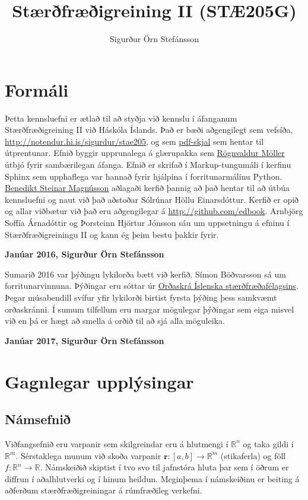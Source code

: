 \documentclass[a4paper,10pt,icelandic]{sphinxmanual}
\title{Stærðfræðigreining II (STÆ205G)}
\author{Sigurður Örn Stefánsson}
\begin{document}
\maketitle
\tableofcontents
{}\label{index::doc}



\chapter*{Formáli}
\label{formali::doc}\label{formali:staerfraeigreining-ii-stae205g-haskoli-islands-vor-2016}\label{formali:formali}
Þetta kennsluefni er ætlað til að styðja við kennslu í áfanganum
Stærðfræðigreining II við Háskóla Íslands. Það er bæði aðgengilegt sem
vefsíða, \href{http://notendur.hi.is/sigurdur/stae205}{http://notendur.hi.is/sigurdur/stae205}, og sem \href{https://notendur.hi.is/sigurdur/stae205/stae205.pdf}{pdf-skjal} sem hentar
til útprentunar. Efnið byggir upprunalega á glærupakka sem \href{http://starfsfolk.hi.is/simaskra/1198}{Rögnvaldur
Möller} útbjó fyrir sambærilegan áfanga. Efnið er skrifað í
Markup-tungumáli í kerfinu Sphinx sem upphaflega var hannað fyrir
hjálpina í forritunarmálinu Python. \href{http://notendur.hi.is/bsm}{Benedikt Steinar Magnússon} aðlagaði kerfið þannig að það hentar til
að útbúa kennsluefni og naut við það aðstoðar Sólrúnar Höllu
Einarsdóttur. Kerfið er opið og allar viðbætur við það eru
aðgengilegar á \href{http://github.com/edbook}{http://github.com/edbook}. Arnbjörg Soffía Árnadóttir og
Þorsteinn Hjörtur Jónsson sáu um uppsetningu á efninu í
Stærðfræðigreiningu II og kann ég þeim bestu þakkir fyrir.

\textbf{Janúar 2016, Sigurður Örn Stefánsson}

Sumarið 2016 var þýðingu lykilorða bætt við kerfið. Símon Böðvarsson sá um forritunarvinnuna. Þýðingar eru sóttar úr \href{http://stæ.is/os}{Orðaskrá Íslenska stærðfræðafélagsins}. Þegar músabendill svífur yfir lykilorði birtist fyrsta þýðing þess samkvæmt orðaskránni. Í sumum tilfellum eru margar mögulegar þýðingar sem eiga misvel við en þá er hægt að smella á orðið til að sjá alla möguleika.

\textbf{Janúar 2017, Sigurður Örn Stefánsson}


\chapter*{Gagnlegar upplýsingar}
\label{umnamskeidid::doc}\label{umnamskeidid:gagnlegar-upplysingar}

\section*{Námsefnið}
\label{umnamskeidid:namsefni}
Viðfangsefnið eru varpanir sem skilgreindar eru á
hlutmengi í \(\mathbb{R}^n\) og taka gildi í \(\mathbb{R}^m\).  Sérstaklega munum við skoða
varpanir \(\mathbf{r}:[a,b]\rightarrow \mathbb{R}^m\) (stikaferla) og föll \(f:\mathbb{R}^n\rightarrow
\mathbb{R}\).  Námskeiðið skiptist í tvo svo til jafnstóra hluta þar sem í
öðrum er diffrun í aðalhlutverki og í hinum heildun.   Meginþema í
námskeiðinu er beiting á aðferðum stærðfræðigreiningar á rúmfræðileg
verkefni.
\end{document}
